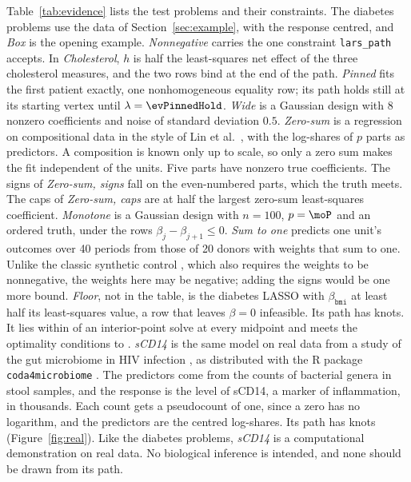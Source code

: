 \documentclass[11pt]{article}
\theoremstyle{remark}
\begin{document}
Table~\ref{tab:evidence} lists the test problems and their constraints. The diabetes
problems use the data of Section~\ref{sec:example}, with the response centred, and
\emph{Box} is the opening example. \emph{Nonnegative} carries the one constraint
\texttt{lars\_path} accepts. In \emph{Cholesterol}, $h$ is half the least-squares net
effect of the three cholesterol measures, and the two rows bind at the end of the path.
\emph{Pinned} fits the first patient exactly, one nonhomogeneous equality row; its path
holds still at its starting vertex until $\lambda=\evPinnedHold$. \emph{Wide} is a
Gaussian design with 8 nonzero coefficients and noise of standard deviation $0.5$.
\emph{Zero-sum} is a regression on compositional data in the style of Lin et al.\
\cite{lin2014}, with the log-shares of $p$ parts as predictors. A composition is known
only up to scale, so only a zero sum makes the fit independent of the units. Five
parts have nonzero true coefficients. The signs of
\emph{Zero-sum, signs} fall on the even-numbered parts, which the truth meets. The caps
of \emph{Zero-sum, caps} are at half the largest zero-sum least-squares coefficient.
\emph{Monotone} is a Gaussian design with $n=100$, $p=\moP$ and an ordered truth, under
the rows $\beta_j-\beta_{j+1}\le0$. \emph{Sum to one}
predicts one unit's outcomes over 40 periods from those of 20 donors with weights that
sum to one. Unlike the classic synthetic control \cite{abadie2010}, which also requires
the weights to be nonnegative, the weights here may be negative; adding the signs would
be one more bound. \emph{Floor}, not in the table, is the diabetes LASSO with
$\beta_{\texttt{bmi}}$ at least half its least-squares value, a row that leaves $\beta=0$ infeasible. Its path has \flKnots{} knots. It
lies within \flGap{} of an interior-point solve at every midpoint and meets the
optimality conditions to \flKKT{}.
\emph{sCD14} is the same model on real data from a study of the gut microbiome in HIV
infection \cite{noguerajulian2016}, as distributed with the R package
\texttt{coda4microbiome} \cite{calle2023}. The predictors come from the counts of
\rdGenera{} bacterial genera in \rdSamples{} stool samples, and the response is the
level of sCD14, a marker of inflammation, in thousands. Each count gets a pseudocount of one, since a zero has no
logarithm, and the predictors are the centred log-shares. Its path has \rdKnots{} knots
(Figure~\ref{fig:real}). Like the diabetes problems, \emph{sCD14} is a computational
demonstration on real data. No biological inference is intended, and none should be
drawn from its path.
\end{document}
